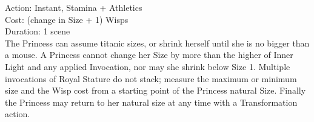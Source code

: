 \noindent Action: Instant, Stamina + Athletics\\

\noindent Cost: (change in Size + 1) Wisps\\

\noindent Duration: 1 scene \\

\noindent The Princess can assume titanic sizes, or shrink herself until she is no bigger than a mouse. A Princess cannot change her Size by more than the higher of Inner Light and any applied Invocation, nor may she shrink below Size 1. Multiple invocations of Royal Stature do not stack; measure the maximum or minimum size and the Wisp cost from a starting point of the Princess natural Size. Finally the Princess may return to her natural size at any time with a Transformation action.  \label{SizeTable}


